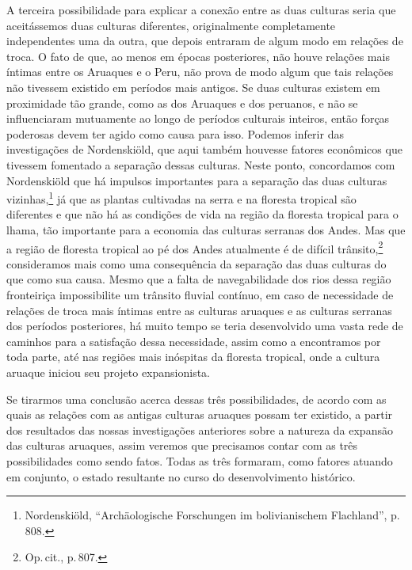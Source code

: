 A terceira possibilidade para explicar a conexão entre as duas culturas
seria que aceitássemos duas culturas diferentes, originalmente
completamente independentes uma da outra, que depois entraram de algum
modo em relações de troca. O fato de que, ao menos em épocas
posteriores, não houve relações mais íntimas entre os Aruaques e o Peru,
não prova de modo algum que tais relações não tivessem existido em
períodos mais antigos. Se duas culturas existem em proximidade tão
grande, como as dos Aruaques e dos peruanos, e não se influenciaram
mutuamente ao longo de períodos culturais inteiros, então forças
poderosas devem ter agido como causa para isso. Podemos inferir das
investigações de Nordenskiöld, que aqui também houvesse fatores
econômicos que tivessem fomentado a separação dessas culturas. Neste
ponto, concordamos com Nordenskiöld que há impulsos importantes para a
separação das duas culturas vizinhas,\footnote{Nordenskiöld,
  ``Archäologische Forschungen im bolivianischem Flachland'', p.\,808.} 
  já que as plantas cultivadas na serra e na floresta tropical
são diferentes e que não há as condições de vida na região da floresta
tropical para o lhama, tão importante para a economia das culturas
serranas dos Andes. Mas que a região de floresta tropical ao pé dos
Andes atualmente é de difícil trânsito,\footnote{Op.\,cit., p.\,807.}
consideramos mais como uma consequência da separação das duas culturas
do que como sua causa. Mesmo que a falta de navegabilidade dos rios
dessa região fronteiriça impossibilite um trânsito fluvial contínuo, em
caso de necessidade de relações de troca mais íntimas entre as culturas
aruaques e as culturas serranas dos períodos posteriores, há muito tempo
se teria desenvolvido uma vasta rede de caminhos para a satisfação dessa
necessidade, assim como a encontramos por toda parte, até nas regiões
mais inóspitas da floresta tropical, onde a cultura aruaque iniciou seu
projeto expansionista.

Se tirarmos uma conclusão acerca dessas três possibilidades, de acordo
com as quais as relações com as antigas culturas aruaques possam ter
existido, a partir dos resultados das nossas investigações anteriores
sobre a natureza da expansão das culturas aruaques, assim veremos que
precisamos contar com as três possibilidades como sendo fatos. Todas as
três formaram, como fatores atuando em conjunto, o estado resultante no
curso do desenvolvimento histórico.

